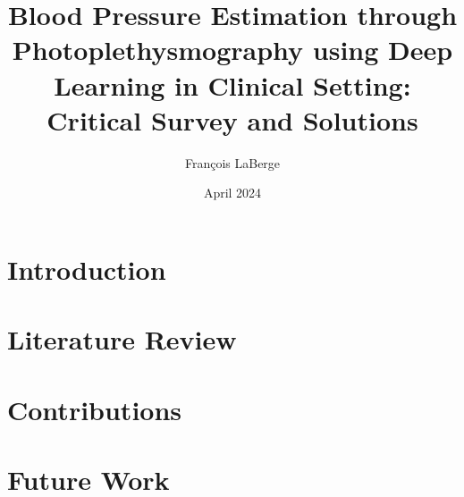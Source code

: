 \documentclass{beamer}
\title{Blood Pressure Estimation through Photoplethysmography using Deep Learning in Clinical Setting: Critical Survey and Solutions}
\author{François LaBerge}
\institute[]{Concordia University}
\date{April 2024}
\begin{document}

\frame{\titlepage}


\section{Introduction}


\section{Literature Review}


\section{Contributions}


\section{Future Work}







\end{document}
